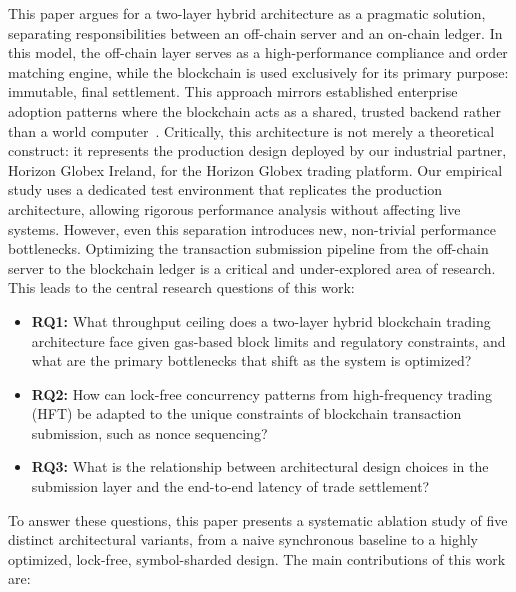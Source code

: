 This paper argues for a two-layer hybrid architecture as a pragmatic solution, separating responsibilities between an off-chain server and an on-chain ledger. In this model, the off-chain layer serves as a high-performance compliance and order matching engine, while the blockchain is used exclusively for its primary purpose: immutable, final settlement. This approach mirrors established enterprise adoption patterns where the blockchain acts as a shared, trusted backend rather than a world computer~\cite{jamithireddy2025hybrid}. Critically, this architecture is not merely a theoretical construct: it represents the production design deployed by our industrial partner, Horizon Globex Ireland, for the Horizon Globex trading platform. Our empirical study uses a dedicated test environment that replicates the production architecture, allowing rigorous performance analysis without affecting live systems. However, even this separation introduces new, non-trivial performance bottlenecks. Optimizing the transaction submission pipeline from the off-chain server to the blockchain ledger is a critical and under-explored area of research. This leads to the central research questions of this work:

\begin{itemize}
    \item \textbf{RQ1:} What throughput ceiling does a two-layer hybrid blockchain trading architecture face given gas-based block limits and regulatory constraints, and what are the primary bottlenecks that shift as the system is optimized?
    \item \textbf{RQ2:} How can lock-free concurrency patterns from high-frequency trading (HFT) be adapted to the unique constraints of blockchain transaction submission, such as nonce sequencing?
    \item \textbf{RQ3:} What is the relationship between architectural design choices in the submission layer and the end-to-end latency of trade settlement?
\end{itemize}

To answer these questions, this paper presents a systematic ablation study of five distinct architectural variants, from a naive synchronous baseline to a highly optimized, lock-free, symbol-sharded design. The main contributions of this work are:

